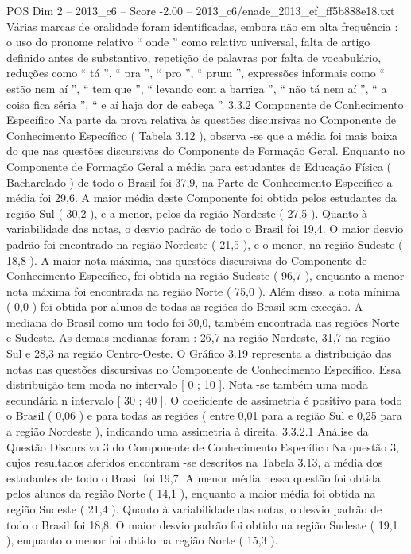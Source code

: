 \begin{textsample}{POS Dim 2 – 2013\_c6 – Score -2.00 – 2013\_c6/enade\_2013\_ef\_ff5b888e18.txt}
Várias marcas de oralidade foram identificadas, embora não em alta frequência : o uso do pronome relativo “ onde ” como relativo universal, falta de artigo definido antes de substantivo, repetição de palavras por falta de vocabulário, reduções como “ tá ”, “ pra ”, “ pro ”, “ prum ”, expressões informais como “ estão nem aí ”, “ tem que ”, “ levando com a barriga ”, “ não tá nem aí ”, “ a coisa fica séria ”, “ e aí haja dor de cabeça ”. 3.3.2 Componente de Conhecimento Específico Na parte da prova relativa às questões discursivas no Componente de Conhecimento Específico ( Tabela 3.12 ), observa -se que a média foi mais baixa do que nas questões discursivas do Componente de Formação Geral.
Enquanto no Componente de Formação Geral a média para estudantes de Educação Física ( Bacharelado ) de todo o Brasil foi 37,9, na Parte de Conhecimento Específico a média foi 29,6.
A maior média deste Componente foi obtida pelos estudantes da região Sul ( 30,2 ), e a menor, pelos da região Nordeste ( 27,5 ).
Quanto à variabilidade das notas, o desvio padrão de todo o Brasil foi 19,4.
O maior desvio padrão foi encontrado na região Nordeste ( 21,5 ), e o menor, na região Sudeste ( 18,8 ).
A maior nota máxima, nas questões discursivas do Componente de Conhecimento Específico, foi obtida na região Sudeste ( 96,7 ), enquanto a menor nota máxima foi encontrada na região Norte ( 75,0 ).
Além disso, a nota mínima ( 0,0 ) foi obtida por alunos de todas as regiões do Brasil sem exceção.
A mediana do Brasil como um todo foi 30,0, também encontrada nas regiões Norte e Sudeste.
As demais medianas foram : 26,7 na região Nordeste, 31,7 na região Sul e 28,3 na região Centro-Oeste.
O Gráfico 3.19 representa a distribuição das notas nas questões discursivas no Componente de Conhecimento Específico.
Essa distribuição tem moda no intervalo [ 0 ; 10 ].
Nota -se também uma moda secundária n intervalo [ 30 ; 40 ].
O coeficiente de assimetria é positivo para todo o Brasil ( 0,06 ) e para todas as regiões ( entre 0,01 para a região Sul e 0,25 para a região Nordeste ), indicando uma assimetria à direita. 3.3.2.1 Análise da Questão Discursiva 3 do Componente de Conhecimento Específico Na questão 3, cujos resultados aferidos encontram -se descritos na Tabela 3.13, a média dos estudantes de todo o Brasil foi 19,7.
A menor média nessa questão foi obtida pelos alunos da região Norte ( 14,1 ), enquanto a maior média foi obtida na região Sudeste ( 21,4 ).
Quanto à variabilidade das notas, o desvio padrão de todo o Brasil foi 18,8.
O maior desvio padrão foi obtido na região Sudeste ( 19,1 ), enquanto o menor foi obtido na região Norte ( 15,3 ).

\end{textsample}
